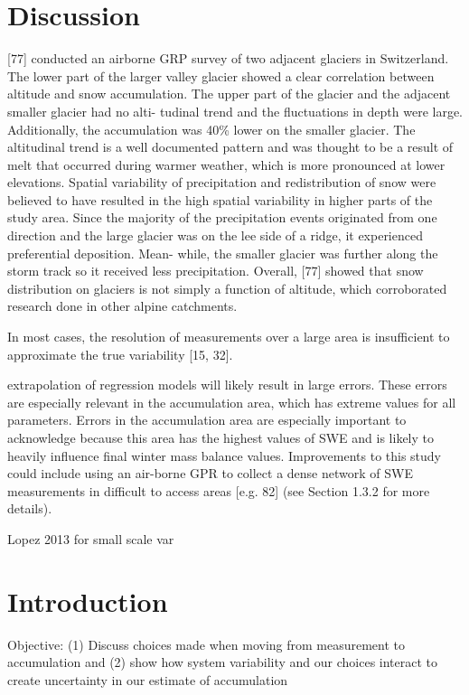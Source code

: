 \documentclass[twocolumn,letterpaper]{igs}
\begin{document}

\section{Discussion}
[77] conducted an airborne GRP survey of two adjacent glaciers in Switzerland. The
lower part of the larger valley glacier showed a clear correlation between altitude and snow
accumulation. The upper part of the glacier and the adjacent smaller glacier had no alti-
tudinal trend and the fluctuations in depth were large. Additionally, the accumulation was
40\% lower on the smaller glacier. The altitudinal trend is a well documented pattern and
was thought to be a result of melt that occurred during warmer weather, which is more
pronounced at lower elevations. Spatial variability of precipitation and redistribution of
snow were believed to have resulted in the high spatial variability in higher parts of the
study area. Since the majority of the precipitation events originated from one direction and
the large glacier was on the lee side of a ridge, it experienced preferential deposition. Mean-
while, the smaller glacier was further along the storm track so it received less precipitation.
Overall, [77] showed that snow distribution on glaciers is not simply a function of altitude,
which corroborated research done in other alpine catchments.

 In most cases, the resolution of measurements over a large area is insufficient to
approximate the true variability [15, 32].


extrapolation of regression models will
likely result in large errors. These errors are especially relevant in the accumulation area,
which has extreme values for all parameters. Errors in the accumulation area are especially
important to acknowledge because this area has the highest values of SWE and is likely to
heavily influence final winter mass balance values. Improvements to this study could include
using an air-borne GPR to collect a dense network of SWE measurements in difficult to
access areas [e.g. 82] (see Section 1.3.2 for more details).


Lopez 2013 for small scale var

\section{Introduction}

Objective: (1) Discuss choices made when moving from measurement to accumulation and (2) show how system variability and our choices interact to create uncertainty in our estimate of accumulation
\end{document}
